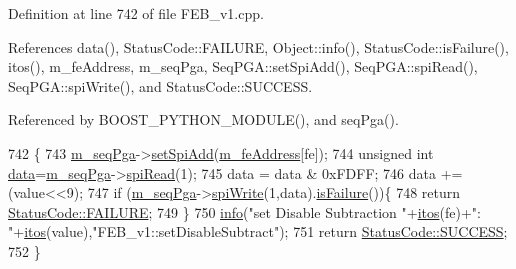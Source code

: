 Definition at line 742 of file F\+E\+B\+\_\+v1.\+cpp.



References data(), Status\+Code\+::\+F\+A\+I\+L\+U\+RE, Object\+::info(), Status\+Code\+::is\+Failure(), itos(), m\+\_\+fe\+Address, m\+\_\+seq\+Pga, Seq\+P\+G\+A\+::set\+Spi\+Add(), Seq\+P\+G\+A\+::spi\+Read(), Seq\+P\+G\+A\+::spi\+Write(), and Status\+Code\+::\+S\+U\+C\+C\+E\+SS.



Referenced by B\+O\+O\+S\+T\+\_\+\+P\+Y\+T\+H\+O\+N\+\_\+\+M\+O\+D\+U\+L\+E(), and seq\+Pga().


\begin{DoxyCode}
742                                                          \{
743   \hyperlink{classFEB__v1_a6c7804ac86796f233a8393043adf2e77}{m\_seqPga}->\hyperlink{classSeqPGA_ac998ce3a6d9b5f2e88cc8393f8c1df53}{setSpiAdd}(\hyperlink{classFEB__v1_a4e1945c2d5b434125f375e9d0fc6d99f}{m\_feAddress}[fe]);
744   \textcolor{keywordtype}{unsigned} \textcolor{keywordtype}{int} \hyperlink{classFEB__v1_a6bca4320bd3bbbc32efc81097f33421a}{data}=\hyperlink{classFEB__v1_a6c7804ac86796f233a8393043adf2e77}{m\_seqPga}->\hyperlink{classSeqPGA_ab3d0e5e5d4014bc7a92588a76b8713d4}{spiRead}(1);
745   data = data & 0xFDFF;
746   data += (value<<9);
747   \textcolor{keywordflow}{if} (\hyperlink{classFEB__v1_a6c7804ac86796f233a8393043adf2e77}{m\_seqPga}->\hyperlink{classSeqPGA_ad4421841ce4ce8b88ad13f63216f0743}{spiWrite}(1,data).\hyperlink{classStatusCode_a5dd22dc6eb2c52fc4cabc58f6dea2eb7}{isFailure}())\{
748     \textcolor{keywordflow}{return} \hyperlink{classStatusCode_a6f565cbeadc76d14c72f047e5e85eb4ba3da73d4c469762eb9d3c960368252b26}{StatusCode::FAILURE};
749   \}
750   \hyperlink{classObject_a644fd329ea4cb85f54fa6846484b84a8}{info}(\textcolor{stringliteral}{"set Disable Subtraction "}+\hyperlink{Tools_8h_af330027dbdafb9a30768b3613c553e60}{itos}(fe)+\textcolor{stringliteral}{": "}+\hyperlink{Tools_8h_af330027dbdafb9a30768b3613c553e60}{itos}(value),\textcolor{stringliteral}{"FEB\_v1::setDisableSubtract"});
751   \textcolor{keywordflow}{return} \hyperlink{classStatusCode_a6f565cbeadc76d14c72f047e5e85eb4badd0da38d3ba0d922efd1f4619bc37ad8}{StatusCode::SUCCESS};
752 \}
\end{DoxyCode}
\mbox{\label{classFEB__v1_a2ad20ff9db6a0ceef875d874bae214a9}} 
